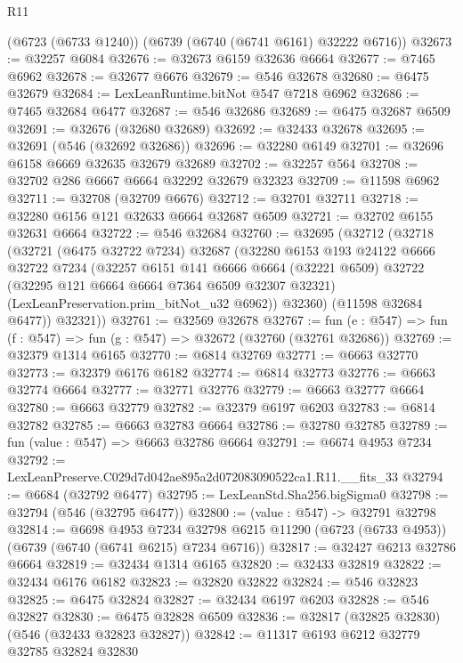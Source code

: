 \begin{lexlean}{R11}
\begin{coremodule}
    (@6723 (@6733 @1240))
    (@6739 (@6740 (@6741 @6161) @32222 @6716))
@32673 := @32257 @6084
@32676 := @32673 @6159 @32636 @6664
@32677 := @7465 @6962
@32678 := @32677 @6676
@32679 := @546 @32678
@32680 := @6475 @32679
@32684 := LexLeanRuntime.bitNot @547 @7218 @6962
@32686 := @7465 @32684 @6477
@32687 := @546 @32686
@32689 := @6475 @32687 @6509
@32691 := @32676 (@32680 @32689)
@32692 := @32433 @32678
@32695 := @32691 (@546 (@32692 @32686))
@32696 := @32280 @6149
@32701 := @32696 @6158 @6669 @32635 @32679 @32689
@32702 := @32257 @564
@32708 := @32702 @286 @6667 @6664 @32292 @32679 @32323
@32709 := @11598 @6962
@32711 := @32708 (@32709 @6676)
@32712 := @32701 @32711
@32718 := @32280 @6156 @121 @32633 @6664 @32687 @6509
@32721 := @32702 @6155 @32631 @6664
@32722 := @546 @32684
@32760 := @32695
    (@32712
      (@32718
        (@32721
          (@6475 @32722 @7234)
          @32687
          (@32280
            @6153
            @193
            @24122
            @6666
            @32722
            @7234
            (@32257
              @6151
              @141
              @6666
              @6664
              (@32221 @6509)
              @32722
              (@32295 @121 @6664 @6664 @7364 @6509 @32307 @32321)
              (LexLeanPreservation.prim_bitNot_u32 @6962))
            @32360)
          (@11598 @32684 @6477))
        @32321))
@32761 := @32569 @32678
@32767 := fun (e : @547) => fun (f : @547) => fun (g : @547) => @32672 (@32760 (@32761 @32686))
@32769 := @32379 @1314 @6165
@32770 := @6814 @32769
@32771 := @6663 @32770
@32773 := @32379 @6176 @6182
@32774 := @6814 @32773
@32776 := @6663 @32774 @6664
@32777 := @32771 @32776
@32779 := @6663 @32777 @6664
@32780 := @6663 @32779
@32782 := @32379 @6197 @6203
@32783 := @6814 @32782
@32785 := @6663 @32783 @6664
@32786 := @32780 @32785
@32789 := fun (value : @547) => @6663 @32786 @6664
@32791 := @6674 @4953 @7234
@32792 := LexLeanPreserve.C029d7d042ae895a2d072083090522ca1.R11.__fits_33
@32794 := @6684 (@32792 @6477)
@32795 := LexLeanStd.Sha256.bigSigma0
@32798 := @32794 (@546 (@32795 @6477))
@32800 := (value : @547) -> @32791 @32798
@32814 := @6698
    @4953
    @7234
    @32798
    @6215
    @11290
    (@6723 (@6733 @4953))
    (@6739 (@6740 (@6741 @6215) @7234 @6716))
@32817 := @32427 @6213 @32786 @6664
@32819 := @32434 @1314 @6165
@32820 := @32433 @32819
@32822 := @32434 @6176 @6182
@32823 := @32820 @32822
@32824 := @546 @32823
@32825 := @6475 @32824
@32827 := @32434 @6197 @6203
@32828 := @546 @32827
@32830 := @6475 @32828 @6509
@32836 := @32817 (@32825 @32830) (@546 (@32433 @32823 @32827))
@32842 := @11317 @6193 @6212 @32779 @32785 @32824 @32830

\end{coremodule}
\end{lexlean}
